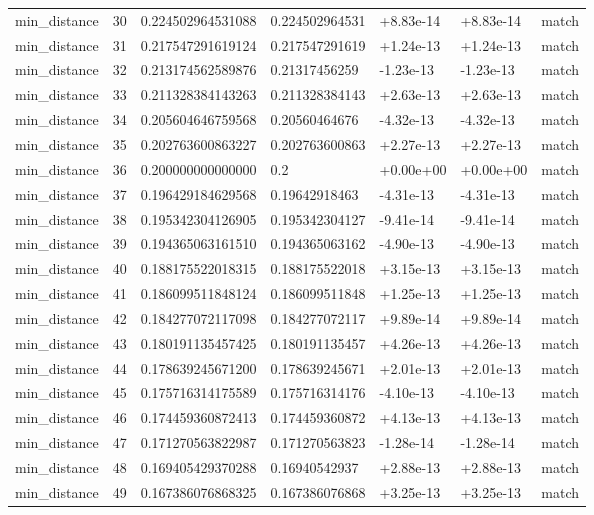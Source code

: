 \begin{longtable}{lllllll}
min\_distance & 30 & 0.224502964531088 & 0.224502964531 & +8.83e-14 & +8.83e-14 & match \\
min\_distance & 31 & 0.217547291619124 & 0.217547291619 & +1.24e-13 & +1.24e-13 & match \\
min\_distance & 32 & 0.213174562589876 & 0.21317456259 & -1.23e-13 & -1.23e-13 & match \\
min\_distance & 33 & 0.211328384143263 & 0.211328384143 & +2.63e-13 & +2.63e-13 & match \\
min\_distance & 34 & 0.205604646759568 & 0.20560464676 & -4.32e-13 & -4.32e-13 & match \\
min\_distance & 35 & 0.202763600863227 & 0.202763600863 & +2.27e-13 & +2.27e-13 & match \\
min\_distance & 36 & 0.200000000000000 & 0.2 & +0.00e+00 & +0.00e+00 & match \\
min\_distance & 37 & 0.196429184629568 & 0.19642918463 & -4.31e-13 & -4.31e-13 & match \\
min\_distance & 38 & 0.195342304126905 & 0.195342304127 & -9.41e-14 & -9.41e-14 & match \\
min\_distance & 39 & 0.194365063161510 & 0.194365063162 & -4.90e-13 & -4.90e-13 & match \\
min\_distance & 40 & 0.188175522018315 & 0.188175522018 & +3.15e-13 & +3.15e-13 & match \\
min\_distance & 41 & 0.186099511848124 & 0.186099511848 & +1.25e-13 & +1.25e-13 & match \\
min\_distance & 42 & 0.184277072117098 & 0.184277072117 & +9.89e-14 & +9.89e-14 & match \\
min\_distance & 43 & 0.180191135457425 & 0.180191135457 & +4.26e-13 & +4.26e-13 & match \\
min\_distance & 44 & 0.178639245671200 & 0.178639245671 & +2.01e-13 & +2.01e-13 & match \\
min\_distance & 45 & 0.175716314175589 & 0.175716314176 & -4.10e-13 & -4.10e-13 & match \\
min\_distance & 46 & 0.174459360872413 & 0.174459360872 & +4.13e-13 & +4.13e-13 & match \\
min\_distance & 47 & 0.171270563822987 & 0.171270563823 & -1.28e-14 & -1.28e-14 & match \\
min\_distance & 48 & 0.169405429370288 & 0.16940542937 & +2.88e-13 & +2.88e-13 & match \\
min\_distance & 49 & 0.167386076868325 & 0.167386076868 & +3.25e-13 & +3.25e-13 & match \\

\end{longtable}
